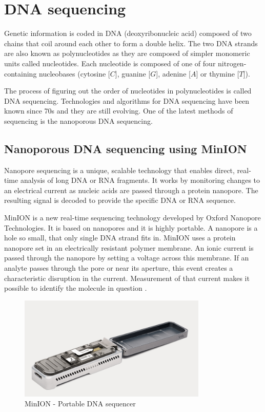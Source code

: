 \chapter{DNA sequencing}

\label{kap:dna_sequencing} %

Genetic information is coded in DNA (deoxyribonucleic acid) composed of two chains that coil around
each other to form a double helix. The two DNA strands are also known as polynucleotides as they are
composed of simpler monomeric units called nucleotides. Each nucleotide is composed of one of four
nitrogen-containing nucleobases (cytosine [$C$], guanine [$G$], adenine [$A$] or thymine [$T$]).

The process of figuring out the order of nucleotides in polynucleotides is called DNA sequencing.
Technologies and algorithms for DNA sequencing have been known since 70s and they are still
evolving. One of the latest methods of sequencing is the nanoporous DNA sequencing.

\section{Nanoporous DNA sequencing using MinION}

Nanopore sequencing is a unique, scalable technology that enables direct, real-time analysis of long
DNA or RNA fragments. It works by monitoring changes to an electrical current as nucleic acids are
passed through a protein nanopore. The resulting signal is decoded to provide the specific DNA or
RNA sequence.

MinION is a new real-time sequencing technology developed by Oxford Nanopore
Technologies. It is based on nanopores and it is highly portable. A nanopore is a hole so small,
that only single DNA strand fits in. MinION uses a protein nanopore set in an electrically resistant
polymer membrane. An ionic current is passed through the nanopore by setting a voltage across this
membrane. If an analyte passes through the pore or near its aperture, this event creates a
characteristic disruption in the current. Measurement of that current makes it possible to identify
the molecule in question \cite{first_look_minion}.

\begin{figure}[H]
  \centerline{\includegraphics[width=0.8\textwidth]{images/minion}}
  \caption[MinION]{MinION - Portable DNA sequencer}
  \label{obr:minion}
\end{figure}

